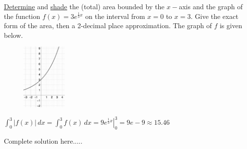 \begin{example}
\underline{Determine} and \underline{shade} the (total) area bounded by the $x-$axis and the graph of the function $f(x)=3e^{\frac{1}{3}x}$ on the interval from $x=0$ to $x=3$. Give the exact form of the area, then a 2-decimal place approximation. The graph of $f$ is given below. 
\begin{figure}[h!]
        \includegraphics[width=0.2\textwidth,inner]{images/defIntgArea/areaEx2.png}
        \captionsetup{justification=justified, singlelinecheck=false}
        \label{fig:areaEx2}
\end{figure}

    \begin{sol}
    $\displaystyle\int_0^3 \bm{|}f(x)\bm{|}\,dx=\int_0^3 f(x)\,dx=\left.9e^{\frac{1}{3}x}\right|_{0}^{3}=9e-9\approx 15.46$
    \end{sol}
    \begin{solL}
    Complete solution here.....
    
    \end{solL}
\end{example}
\newpage
